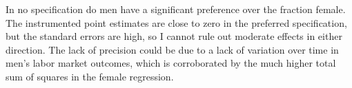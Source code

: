 \documentclass[11pt]{article}
\begin{document}
In no specification do men have a significant preference over the fraction female. The instrumented point estimates are close to zero in the preferred specification, but the standard errors are high, so I cannot rule out moderate effects in either direction. The lack of precision could be due to a lack of variation over time in men's labor market outcomes, which is corroborated by the much higher total sum of squares in the female regression.










\end{document}
